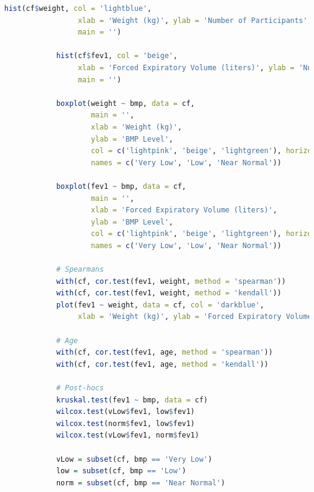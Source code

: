 \documentclass{article}
\begin{document}
\begin{lstlisting}[language=R, basicstyle=\tiny]
			hist(cf$weight, col = 'lightblue',
				 xlab = 'Weight (kg)', ylab = 'Number of Participants',
				 main = '')
			
			hist(cf$fev1, col = 'beige',
				 xlab = 'Forced Expiratory Volume (liters)', ylab = 'Number of Participants',
				 main = '')
			
			boxplot(weight ~ bmp, data = cf, 
					main = '',
					xlab = 'Weight (kg)', 
					ylab = 'BMP Level', 
					col = c('lightpink', 'beige', 'lightgreen'), horizontal = T,
					names = c('Very Low', 'Low', 'Near Normal'))
			
			boxplot(fev1 ~ bmp, data = cf, 
					main = '',
					xlab = 'Forced Expiratory Volume (liters)', 
					ylab = 'BMP Level', 
					col = c('lightpink', 'beige', 'lightgreen'), horizontal = T,
					names = c('Very Low', 'Low', 'Near Normal'))
			
			# Spearmans
			with(cf, cor.test(fev1, weight, method = 'spearman'))
			with(cf, cor.test(fev1, weight, method = 'kendall'))
			plot(fev1 ~ weight, data = cf, col = 'darkblue',
				 xlab = 'Weight (kg)', ylab = 'Forced Expiratory Volume (liters)')
			
			# Age
			with(cf, cor.test(fev1, age, method = 'spearman'))
			with(cf, cor.test(fev1, age, method = 'kendall'))
			
			# Post-hocs
			kruskal.test(fev1 ~ bmp, data = cf)
			wilcox.test(vLow$fev1, low$fev1)
			wilcox.test(norm$fev1, low$fev1)
			wilcox.test(vLow$fev1, norm$fev1)
			
			vLow = subset(cf, bmp == 'Very Low')
			low = subset(cf, bmp == 'Low')
			norm = subset(cf, bmp == 'Near Normal')
			\end{lstlisting}
			
			






		


		
\end{document}

